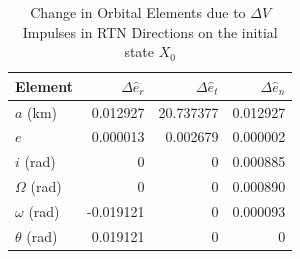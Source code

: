 \documentclass[12pt,twocolumn]{article}  %
\begin{document}
\begin{table}[H]
    \centering
    \begin{footnotesize}  %
    \begin{tabular}{lrrr}
    \toprule
    \textbf{Element} & \textbf{$\Delta \hat{e}_r$} & \textbf{$\Delta \hat{e}_t$} & \textbf{$\Delta \hat{e}_n$} \\
    \midrule
    $a$ (km)            &  0.012927 & 20.737377 & 0.012927 \\
    $e$                 & 0.000013   & 0.002679 & 0.000002 \\
    $i$ (rad)           & 0   & 0  & 0.000885 \\
    $\Omega$ (rad)      & 0   & 0  & 0.000890 \\
    $\omega$ (rad)      & -0.019121   & 0 & 0.000093 \\
    $\theta$ (rad)      & 0.019121   & 0 & 0 \\
    \bottomrule
    \end{tabular}
    \end{footnotesize}
    \caption{Change in Orbital Elements due to $\Delta V$ Impulses in RTN Directions on the initial state $X_{0}$}
    \label{tab:orbital-changes}
\end{table}
\end{document}
